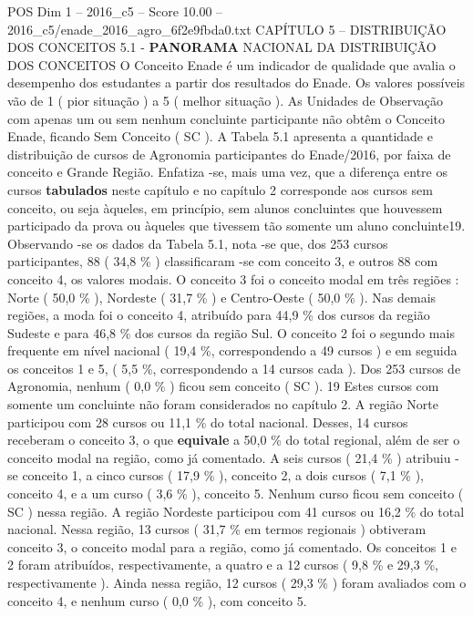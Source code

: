 \begin{textsample}{POS Dim 1 – 2016\_c5 – Score 10.00 – 2016\_c5/enade\_2016\_agro\_6f2e9fbda0.txt}  \label{ex:f1_pos_075}
CAPÍTULO 5 – DISTRIBUIÇÃO DOS CONCEITOS 5.1 - \textbf{PANORAMA} NACIONAL DA DISTRIBUIÇÃO DOS CONCEITOS O Conceito Enade é um indicador de qualidade que avalia o desempenho dos estudantes a partir dos resultados do Enade.
Os valores possíveis vão de 1 ( pior situação ) a 5 ( melhor situação ).
As Unidades de Observação com apenas um ou sem nenhum concluinte participante não obtêm o Conceito Enade, ficando Sem Conceito ( SC ).
A Tabela 5.1 apresenta a quantidade e distribuição de cursos de Agronomia participantes do Enade/2016, por faixa de conceito e Grande Região.
Enfatiza -se, mais uma vez, que a diferença entre os cursos \textbf{tabulados} neste capítulo e no capítulo 2 corresponde aos cursos sem conceito, ou seja àqueles, em princípio, sem alunos concluintes que houvessem participado da prova ou àqueles que tivessem tão somente um aluno concluinte19.
Observando -se os dados da Tabela 5.1, nota -se que, dos 253 cursos participantes, 88 ( 34,8 \% ) classificaram -se com conceito 3, e outros 88 com conceito 4, os valores modais.
O conceito 3 foi o conceito modal em três regiões : Norte ( 50,0 \% ), Nordeste ( 31,7 \% ) e Centro-Oeste ( 50,0 \% ).
Nas demais regiões, a moda foi o conceito 4, atribuído para 44,9 \% dos cursos da região Sudeste e para 46,8 \% dos cursos da região Sul.
O conceito 2 foi o segundo mais frequente em nível nacional ( 19,4 \%, correspondendo a 49 cursos ) e em seguida os conceitos 1 e 5, ( 5,5 \%, correspondendo a 14 cursos cada ).
Dos 253 cursos de Agronomia, nenhum ( 0,0 \% ) ficou sem conceito ( SC ). 19 Estes cursos com somente um concluinte não foram considerados no capítulo 2.
A região Norte participou com 28 cursos ou 11,1 \% do total nacional.
Desses, 14 cursos receberam o conceito 3, o que \textbf{equivale} a 50,0 \% do total regional, além de ser o conceito modal na região, como já comentado.
A seis cursos ( 21,4 \% ) atribuiu -se conceito 1, a cinco cursos ( 17,9 \% ), conceito 2, a dois cursos ( 7,1 \% ), conceito 4, e a um curso ( 3,6 \% ), conceito 5.
Nenhum curso ficou sem conceito ( SC ) nessa região.
A região Nordeste participou com 41 cursos ou 16,2 \% do total nacional.
Nessa região, 13 cursos ( 31,7 \% em termos regionais ) obtiveram conceito 3, o conceito modal para a região, como já comentado.
Os conceitos 1 e 2 foram atribuídos, respectivamente, a quatro e a 12 cursos ( 9,8 \% e 29,3 \%, respectivamente ).
Ainda nessa região, 12 cursos ( 29,3 \% ) foram avaliados com o conceito 4, e nenhum curso ( 0,0 \% ), com conceito 5.

\end{textsample}
